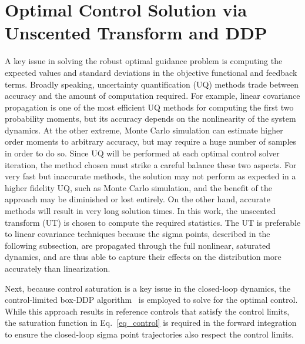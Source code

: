 \documentclass[journal ]{new-aiaa}
\begin{document}
\section*{Optimal Control Solution via Unscented Transform and DDP}
A key issue in solving the robust optimal guidance problem is computing the expected values and standard deviations in the objective functional and feedback terms. Broadly speaking, uncertainty quantification (UQ) methods trade between accuracy and the amount of computation required. For example, linear covariance propagation is one of the most efficient UQ methods for computing the first two probability moments, but its accuracy depends on the nonlinearity of the system dynamics. At the other extreme, Monte Carlo simulation can estimate higher order moments to arbitrary accuracy, but may require a huge number of samples in order to do so. Since UQ will be performed at each optimal control solver iteration, the method chosen must strike a careful balance these two aspects. For very fast but inaccurate methods, the solution may not perform as expected in a higher fidelity UQ, such as Monte Carlo simulation, and the benefit of the approach may be diminished or lost entirely. On the other hand, accurate methods will result in very long solution times. In this work, the unscented transform (UT) \cite{UT1997} is chosen to compute the required statistics. The UT is preferable to linear covariance techniques because the sigma points, described in the following subsection, are propagated through the full nonlinear, saturated dynamics, and are thus able to capture their effects on the distribution more accurately than linearization. 

Next, because control saturation is a key issue in the closed-loop dynamics, the control-limited box-DDP algorithm~\cite{DDP_ControlLimited} is employed to solve for the optimal control. While this approach results in reference controls that satisfy the control limits, the saturation function in Eq.~\ref{eq_control} is required in the forward integration to ensure the closed-loop sigma point trajectories also respect the control limits.
\end{document}
